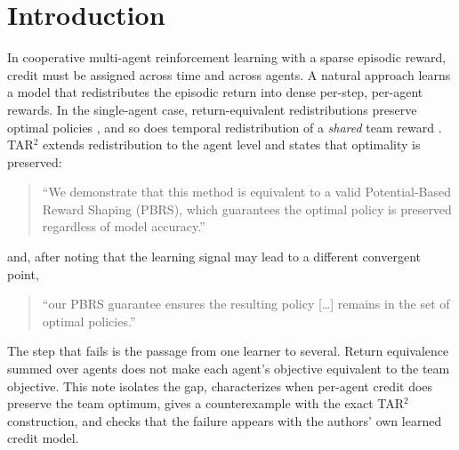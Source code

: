 \documentclass[11pt]{article}
\theoremstyle{remark}
\begin{document}
\section{Introduction}

In cooperative multi-agent reinforcement learning with a sparse episodic reward, credit must be assigned across time and across agents. A natural approach learns a model that redistributes the episodic return into dense per-step, per-agent rewards. In the single-agent case, return-equivalent redistributions preserve optimal policies \citep{arjonamedina2019rudder}, and so does temporal redistribution of a \emph{shared} team reward \citep{xiao2022arel}. TAR$^2$ \citep{kapoor2024tar2,kapoor2025tar2} extends redistribution to the agent level and states that optimality is preserved:

\begin{quote}\small
``We demonstrate that this method is equivalent to a valid Potential-Based Reward Shaping (PBRS), which guarantees the optimal policy is preserved regardless of model accuracy.'' \citep[abstract]{kapoor2025tar2}
\end{quote}

\noindent and, after noting that the learning signal may lead to a different convergent point,

\begin{quote}\small
``our PBRS guarantee ensures the resulting policy [\dots] remains in the set of optimal policies.'' \citep[Sec.~3.3]{kapoor2025tar2}
\end{quote}

The step that fails is the passage from one learner to several. Return equivalence summed over agents does not make each agent's objective equivalent to the team objective. This note isolates the gap, characterizes when per-agent credit does preserve the team optimum, gives a counterexample with the exact TAR$^2$ construction, and checks that the failure appears with the authors' own learned credit model.
\end{document}
